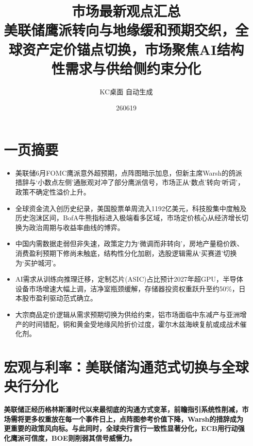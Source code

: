 \documentclass[11pt]{ctexart}
\title{\textbf{市场最新观点汇总}\\[0.4em]{\large 美联储鹰派转向与地缘缓和预期交织，全球资产定价锚点切换，市场聚焦AI结构性需求与供给侧约束分化}}
\author{KC桌面 自动生成}
\date{260619}
\begin{document}
\maketitle
\tableofcontents
\newpage
\section{一页摘要}
\begin{itemize}
  \item 美联储6月FOMC鹰派意外超预期，点阵图暗示加息，但新主席Warsh的鸽派措辞与‘小数点左侧’通胀观对冲了部分鹰派信号，市场正从‘数点’转向‘听词’，政策不确定性溢价上升。
  \item 全球资金流入创历史纪录，美国股票单周流入1192亿美元，科技股集中度触及历史泡沫区间，BofA牛熊指标进入极端看多区域，市场定价核心从经济增长切换为政治周期与收益率曲线的博弈。
  \item 中国内需数据走弱但非失速，政策定力为‘微调而非转向’，房地产量稳价跌、消费盈利预期下修尚未触底，结构性分化加剧，选股逻辑需从‘买赛道’切换为‘买护城河’。
  \item AI需求从训练向推理迁移，定制芯片(ASIC)占比预计2027年超GPU，半导体设备市场增速大幅上调，洁净室瓶颈缓解，存储器投资权重跃升至约50\%，日本股市盈利驱动范式确立。
  \item 大宗商品定价逻辑从需求预期切换为供给约束，铝市场面临中东减产与亚洲增产的时间错配，铜和黄金受地缘风险折价过度，霍尔木兹海峡复航或成战术催化剂。
\end{itemize}
\section{宏观与利率：美联储沟通范式切换与全球央行分化}
\textbf{美联储正经历格林斯潘时代以来最彻底的沟通方式变革，前瞻指引系统性削减，市场需将更多权重放在每一个事件日上，点阵图参考价值下降，Warsh的措辞成为更重要的政策风向标。与此同时，全球央行言行一致性显著分化，ECB用行动强化鹰派可信度，BOE则削弱其信号威慑力。}
\end{document}

